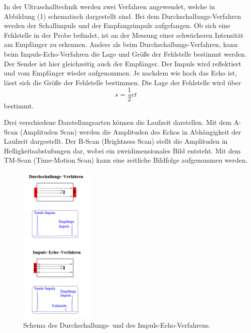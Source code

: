\noindent In der Ultraschalltechnik werden zwei Verfahren angewendet, welche in Abbildung (1) schematisch dargestellt sind.
Bei dem Durchschallungs-Verfahren werden der Schallimpuls und der Empfangsimpuls aufgefangen. Ob sich eine Fehlstelle in der Probe befindet, ist an der Messung einer schwächeren Intensität am Empfänger zu erkennen.
Anders als beim Durchschallungs-Verfahren, kann beim Impuls-Echo-Verfahren die Lage und Größe der Fehlstelle bestimmt werden. Der Sender ist hier gleichzeitig auch der Empfänger. Der Impuls wird reflektiert und vom Empfänger wieder aufgenommen.
Je nachdem wie hoch das Echo ist, lässt sich die Größe der Fehlstelle bestimmen.
Die Lage der Fehlstelle wird über
\begin{equation}
s = \frac{1}{2}ct 
\end{equation}
bestimmt.

\noindent Drei verschiedene Darstellungsarten können die Laufzeit darstellen.
Mit dem A-Scan (Amplituden Scan) werden die Amplituden des Echos in Abhängigkeit der Laufzeit dargestellt.
Der B-Scan (Brightness Scan) stellt die Amplituden in Helligkeitsabstufungen dar, wobei ein zweidimensionales Bild entsteht.
Mit dem TM-Scan (Time-Motion Scan) kann eine zeitliche Bildfolge aufgenommen werden.

\begin{figure}[H]
  \centering
  \includegraphics[height=8cm]{verfahren.png}
  \caption{Schema des Durchschallungs- und des Impuls-Echo-Verfahrens. \cite[S.2]{kent}}
\end{figure}


